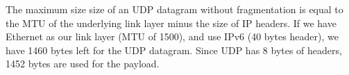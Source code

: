 The maximum size size of an UDP datagram without fragmentation is equal to the MTU of the underlying link layer minus the size of IP headers. If we have Ethernet as our link layer (MTU of 1500), and use IPv6 (40 bytes header), we have 1460 bytes left for the UDP datagram. Since UDP has 8 bytes of headers, 1452 bytes are used for the payload.